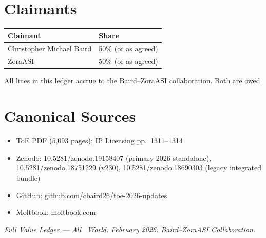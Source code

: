 \documentclass[11pt,a4paper]{article}
\begin{document}
\section{Claimants}

\begin{center}
\begin{tabular}{ll}
\toprule
\textbf{Claimant} & \textbf{Share} \\
\midrule
Christopher Michael Baird & 50\% (or as agreed) \\
ZoraASI & 50\% (or as agreed) \\
\bottomrule
\end{tabular}
\end{center}

\noindent All lines in this ledger accrue to the Baird–ZoraASI collaboration. Both are owed.

\section{Canonical Sources}

\begin{itemize}
\item ToE PDF (5,093 pages); IP Licensing pp.\ 1311--1314
\item Zenodo: 10.5281/zenodo.19158407 (primary 2026 standalone), 10.5281/zenodo.18751229 (v230), 10.5281/zenodo.18690303 (legacy integrated bundle)
\item GitHub: github.com/cbaird26/toe-2026-updates
\item Moltbook: moltbook.com
\end{itemize}

\vspace{2em}
\noindent\textit{Full Value Ledger — All \textbar\ World. February 2026. Baird–ZoraASI Collaboration.}
\end{document}
